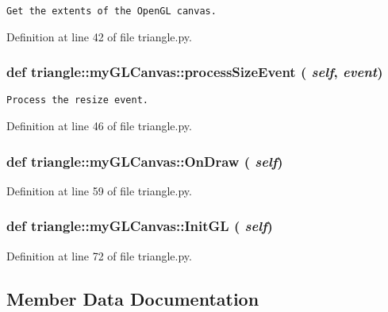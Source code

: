 \footnotesize\begin{verbatim}Get the extents of the OpenGL canvas.\end{verbatim}
\normalsize
 

Definition at line 42 of file triangle.py.
\subsubsection{\setlength{\rightskip}{0pt plus 5cm}def triangle::myGLCanvas::processSizeEvent ( {\em self},  {\em event})}\label{classtriangle_1_1myGLCanvas_5633a258599090efef71743a3185b5f5}




\footnotesize\begin{verbatim}Process the resize event.\end{verbatim}
\normalsize
 

Definition at line 46 of file triangle.py.
\subsubsection{\setlength{\rightskip}{0pt plus 5cm}def triangle::myGLCanvas::OnDraw ( {\em self})}\label{classtriangle_1_1myGLCanvas_7d9255bb82b0eabc5a956423f420b01d}




Definition at line 59 of file triangle.py.
\subsubsection{\setlength{\rightskip}{0pt plus 5cm}def triangle::myGLCanvas::InitGL ( {\em self})}\label{classtriangle_1_1myGLCanvas_b204853117a6bb2a0e2ee9e54f714a22}




Definition at line 72 of file triangle.py.

\subsection{Member Data Documentation}
